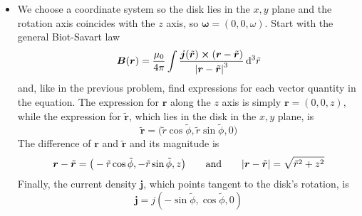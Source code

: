 \documentclass[11pt, a4paper]{article}
\newcommand{\diff}{\mathop{}\!\mathrm{d}} %
\newcommand{\eqtext}[1]{\qquad \text{#1} \qquad}
\renewcommand{\vec}[1]{\bm{#1}} %
\newcommand{\tvec}[1]{\tilde{\vec{#1}}} %
\renewcommand{\t}[1]{\tilde{#1}} %
\renewcommand{\r}{\vec{r}}
\newcommand{\B}{\vec{B}} %
\begin{document}
\begin{itemize}
	\item We choose a coordinate system so the disk lies in the $ x, y $ plane and the rotation axis coincides with the $ z $ axis, so $ \bm{\omega} = (0, 0, \omega) $. Start with the general Biot-Savart law
	\begin{equation*}
		\B (\r) = \frac{\mu_{0}}{4\pi}\int \frac{\vec{j}(\tvec{r}) \cross (\r - \tvec{r})}{\abs{\r - \tvec{r}}^{3}} \diff^{3}\tilde{r}
	\end{equation*}
	and, like in the previous problem, find expressions for each vector quantity in the equation. The expression for $ \r $ along the $ z $ axis is simply $ \r = (0, 0, z) $, while the expression for $ \tvec{r} $, which lies in the disk in the $ x, y $ plane, is
	\begin{equation*}
		\tvec{r} = \big(\tilde{r} \cos \tilde{\phi}, \tilde{r} \sin \tilde{\phi}, 0 \big)
	\end{equation*}
	The difference of $ \r $ and $ \tvec{r} $ and its magnitude is
	\begin{equation*}
		\r - \tvec{r} = \big(-\tilde{r} \cos \tilde{\phi}, - \tilde{r} \sin \tilde{\phi}, z \big) \eqtext{and} \abs{\r - \tvec{r}} = \sqrt{\tilde{r}^{2} + z^{2}}
	\end{equation*}
	Finally, the current density $ \vec{j} $, which points tangent to the disk's rotation, is
	\begin{equation*}
		\vec{j} = j(-\sin \t{\phi}, \cos \t{\phi},0 )
	\end{equation*}
	

\end{itemize}
\end{document}
